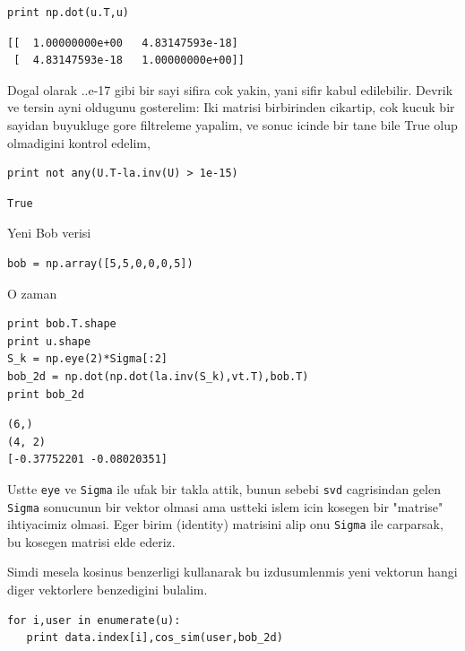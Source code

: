 \documentclass[12pt,fleqn]{article}\usepackage{../common}
\begin{document}
\begin{verbatim}
print np.dot(u.T,u)
\end{verbatim}

\begin{verbatim}
[[  1.00000000e+00   4.83147593e-18]
 [  4.83147593e-18   1.00000000e+00]]
\end{verbatim}

Dogal olarak ..e-17 gibi bir sayi sifira cok yakin, yani sifir kabul
edilebilir. Devrik ve tersin ayni oldugunu gosterelim: Iki matrisi
birbirinden cikartip, cok kucuk bir sayidan buyukluge gore filtreleme
yapalim, ve sonuc icinde bir tane bile True olup olmadigini kontrol
edelim,

\begin{verbatim}
print not any(U.T-la.inv(U) > 1e-15)
\end{verbatim}

\begin{verbatim}
True
\end{verbatim}

Yeni Bob verisi 

\begin{verbatim}
bob = np.array([5,5,0,0,0,5]) 
\end{verbatim}

O zaman 

\begin{verbatim}
print bob.T.shape
print u.shape
S_k = np.eye(2)*Sigma[:2]
bob_2d = np.dot(np.dot(la.inv(S_k),vt.T),bob.T)
print bob_2d
\end{verbatim}

\begin{verbatim}
(6,)
(4, 2)
[-0.37752201 -0.08020351]
\end{verbatim}

Ustte \verb!eye! ve \verb!Sigma! ile ufak bir takla attik, bunun sebebi
\verb!svd! cagrisindan gelen \verb!Sigma!  sonucunun bir vektor olmasi ama
ustteki islem icin kosegen bir "matrise" ihtiyacimiz olmasi. Eger birim
(identity) matrisini alip onu \verb!Sigma! ile carparsak, bu kosegen
matrisi elde ederiz.

Simdi mesela kosinus benzerligi kullanarak bu izdusumlenmis yeni
vektorun hangi diger vektorlere benzedigini bulalim.

\begin{verbatim}
for i,user in enumerate(u):
   print data.index[i],cos_sim(user,bob_2d)
\end{verbatim}
\end{document}
